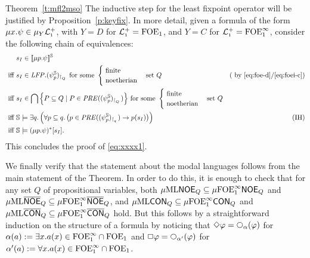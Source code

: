 \begin{proofof}{Theorem~\ref{t:mfl2mso}}
The inductive step for the least fixpoint operator will be justified by 
Proposition~\ref{p:keyfix}.
In more detail, given a formula of the form $\mu x. \psi \in\mu_{Y} \mathcal{L}_{\scriptscriptstyle 1}^{+}$,
with $Y=D$ for $\mathcal{L}_{\scriptscriptstyle 1}^{+} =\mathrm{FOE}_1$, and $Y=C$ for $\mathcal{L}_{\scriptscriptstyle 1}^{+} =\mathrm{FOE}^{\infty}_1$, 
consider the following chain of equivalences:
\begin{align*}
  & s_{I} \in \mng{\mu p.\psi}^{\bbS} 
\\ \text{ iff } 
  & s_{I} \in \LFP. (\psi^{\model}_{p})_{\rst{Q}} \text{ for some }
        \begin{cases} \text{ finite} & \\ \text{ noetherian} & 
	\end{cases} 
    \text{set } Q 
  & \text{( by \eqref{eq:foe-d}/\eqref{eq:foei-c})}
\\ \text{ iff } 
  &  s_{I} \in \bigcap \Big\{ P \subseteq Q \mid P \in 
         \PRE((\psi^{\model}_{p})_{\rst{Q}})\Big\} 
     \text{ for some }
        \begin{cases} \text{ finite} & \\ \text{ noetherian} & 
	\end{cases} 
     \text{set } Q 
\\ \text{ iff } & 
    \bbS \models \exists q.\, \Big(\forall p \subseteq q.\,
       \big(p \in \PRE((\psi^{\model}_{p})_{\rst{q}}) \to p(s_{I})\big)
       \Big)
   & (\text{IH})
\\ \text{ iff } & 
    \bbS \models (\mu p. \psi)^{*}[s_{I}].
\end{align*}
This concludes the proof of \eqref{eq:xxxx1}.

We finally verify that the statement about the modal languages follows from the main statement of the Theorem.
In order to do this, it is enough to check that for any set $Q$ of propositional variables, both $\mu\mathrm{ML}\mathsf{NOE}_{Q}\subseteq\mu\mathrm{FOE}^{\infty}_1\mathsf{NOE}_{Q}$ and $\mu\mathrm{ML}\overline{\mathsf{NOE}}_{Q}\subseteq\mu\mathrm{FOE}^{\infty}_1\overline{\mathsf{NOE}}_{Q}$, and $\mu\mathrm{ML}\mathsf{CON}_{Q}\subseteq\mu\mathrm{FOE}^{\infty}_1\mathsf{CON}_{Q}$ and $\mu\mathrm{ML}\overline{\mathsf{CON}}_{Q}\subseteq\mu\mathrm{FOE}^{\infty}_1\overline{\mathsf{CON}}_{Q}$ hold. But this follows by a straightforward induction on the structure of a formula by noticing that $\Diamond \varphi = \nxt{\al}(\varphi)$ for $\alpha(a):=\exists x.a(x) \in \mathrm{FOE}^{\infty}_1 \cap \mathrm{FOE}_1$ and $\Box \varphi = \nxt{\al'}(\varphi)$ for $\alpha'(a):=\forall x.a(x) \in \mathrm{FOE}^{\infty}_1 \cap \mathrm{FOE}_1$.
\end{proofof}

